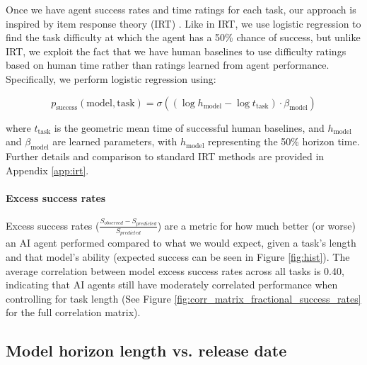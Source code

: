 \documentclass{article}
\begin{document}
Once we have agent success rates and time ratings for each task, our approach is inspired by item response theory (IRT) \cite{baker2001basics}. Like in IRT, we use logistic regression to find the task difficulty at which the agent has a 50\% chance of success, but unlike IRT, we exploit the fact that we have human baselines to use difficulty ratings based on human time rather than ratings learned from agent performance. Specifically, we perform logistic regression using:

\[
p_{\mathrm{success}}(\mathrm{model}, \mathrm{task}) = \sigma((\log h_{\mathrm{model}} - \log t_\mathrm{task}) \cdot \beta_\mathrm{model})
\]

where $t_\mathrm{task}$ is the geometric mean time of successful human baselines, and $h_\mathrm{model}$ and $\beta_\mathrm{model}$ are learned parameters, with $h_\mathrm{model}$ representing the 50\% horizon time. Further details and comparison to standard IRT methods are provided in Appendix \ref{app:irt}.

\paragraph{Excess success rates}
Excess success rates ($\frac{S_{observed}-S_{predicted}}{S_{predicted}}$)
are a metric for how much better (or worse) an AI agent performed compared to what we would expect, given a task's length and that model's ability (expected success can be seen in Figure \ref{fig:hist}). The average correlation between model excess success rates across all tasks is 0.40, indicating that AI agents still have moderately correlated performance when controlling for task length (See Figure \ref{fig:corr_matrix_fractional_success_rates} for the full correlation matrix).

\subsection{Model horizon length vs. release date}
\end{document}
